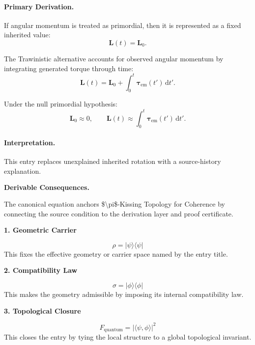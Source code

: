 \paragraph{Primary Derivation.}
If angular momentum is treated as primordial, then it is represented as a fixed inherited value:
\begin{equation}
\mathbf{L}(t)=\mathbf{L}_0.
\end{equation}

The Trawinistic alternative accounts for observed angular momentum by integrating generated torque through time:
\begin{equation}
\mathbf{L}(t)
=
\mathbf{L}_0
+
\int_0^t
\boldsymbol{\tau}_{\mathrm{em}}(t')
\,\mathrm{d}t' .
\end{equation}

Under the null primordial hypothesis:
\begin{equation}
\boxed{
\mathbf{L}_0\approx 0,
\qquad
\mathbf{L}(t)
\approx
\int_0^t
\boldsymbol{\tau}_{\mathrm{em}}(t')
\,\mathrm{d}t' .
}
\end{equation}

\paragraph{Interpretation.}
This entry replaces unexplained inherited rotation with a source-history explanation.

\par\vspace{0.35em}
\noindent\textbf{Derivable Consequences.}\quad
\begingroup
\footnotesize
\raggedright
The canonical equation anchors \$\textbackslash{}pi\$-Kissing Topology for Coherence by connecting the source condition to the derivation layer and proof certificate.
\par\endgroup

\noindent\textbf{1. Geometric Carrier}\par
\[
\rho=\lvert\psi\rangle\langle\psi\rvert
\]
\noindent This fixes the effective geometry or carrier space named by the entry title.\par
\noindent\textbf{2. Compatibility Law}\par
\[
\sigma=\lvert\phi\rangle\langle\phi\rvert
\]
\noindent This makes the geometry admissible by imposing its internal compatibility law.\par
\noindent\textbf{3. Topological Closure}\par
\[
F_{\mathrm{quantum}}=|\langle\psi,\phi\rangle|^2
\]
\noindent This closes the entry by tying the local structure to a global topological invariant.\par

